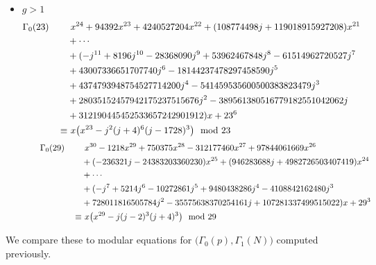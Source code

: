 \documentclass{rs}
\theoremstyle{definition}
\theoremstyle{remark}
\newcommand{\md}{~~{\rm mod}~}
\newcommand{\G}{\Gamma}
\renewcommand{\=}{\approx}
\renewcommand{\-}{\sim}
\numberwithin{equation}{section}
\begin{document}
\begin{itemize}
 \item $g > 1$ 
 \[
  \begin{split}
   \G_0(23) \qquad & ~ x^{24} + 94392 x^{23} + 4240527204 x^{22} + (108774498 j + 119018915927208) x^{21} \hskip .4cm \\
                   & + \cdots \\
                   & +(-j^{11} + 8196 j^{10} - 28368090 j^9 + 53962467848 j^8 - 61514962720527 j^7 \\
                   & + 43007336651707740 j^6 - 18144237478297458590 j^5 \\
                   & + 4374793948754527714200 j^4 - 541459535600500383823479 j^3 \\
                   & + 28035152457942175237515676 j^2 - 389561380516779182551042062 j \\
                   & + 312190445452533657242901912) x + 23^6 \\
            \equiv & ~ x \big(x^{23} - j^2 (j + 4)^6 (j - 1728)^3\big) \md 23 \\
  \end{split}
 \]
 \[
  \begin{split}
   \G_0(29) \qquad & ~ x^{30} - 1218 x^{29} + 750375 x^{28} - 312177460 x^{27} + 97844061669 x^{26} \\
   \hskip 2.4cm      & + (-236321 j - 24383203360230) x^{25} +(946283688 j + 4982726503407419) x^{24} \\
                   & + \cdots \\
                   & +(-j^7 + 5214 j^6 - 10272861 j^5 + 9480438286 j^4 - 4108842162480 j^3 \\
                   & + 728011816505784 j^2 - 35575638370254161 j + 107281337499515022) x + 29^3 \\
            \equiv & ~ x \big(x^{29} - j (j - 2)^3 (j + 4)^3\big) \md 29 
  \end{split}
 \]
\end{itemize}

We compare these to modular equations for $\big(\G_0(p),\G_1(N)\big)$ computed previously.  
\end{document}

